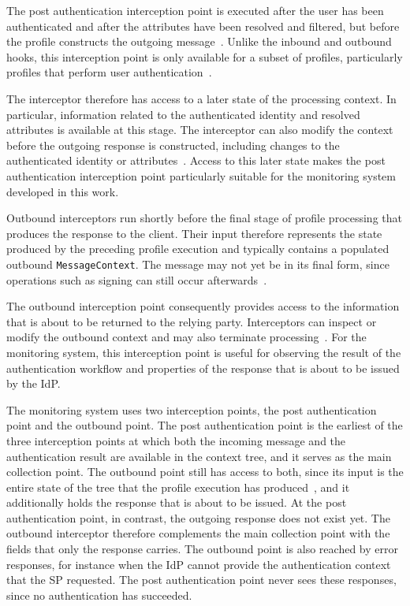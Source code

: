 \documentclass[../main.tex]{subfiles}
\begin{document}
The post authentication interception point is executed after the user has been authenticated and 
after the attributes have been resolved and filtered, but before the profile constructs the 
outgoing message~\cite{ProfileInterceptConfiguration}. 
Unlike the inbound and outbound hooks, this interception point is only available for a subset of 
profiles, particularly profiles that perform user authentication~\cite{ProfileHandling}.

The interceptor therefore has access to a later state of the processing context. 
In particular, information related to the authenticated identity and resolved attributes is available 
at this stage. 
The interceptor can also modify the context before the outgoing response is constructed, including 
changes to the authenticated identity or attributes~\cite{ProfileHandling}. 
Access to this later state makes the post authentication interception point particularly suitable 
for the monitoring system developed in this work. 

Outbound interceptors run shortly before the final stage of profile processing that produces the 
response to the client. 
Their input therefore represents the state produced by the preceding profile execution and typically 
contains a populated outbound \texttt{Message\allowbreak{}Context}. 
The message may not yet be in its final form, since operations such as signing can still occur 
afterwards~\cite{ProfileHandling}.

The outbound interception point consequently provides access to the information that is about to 
be returned to the relying party. 
Interceptors can inspect or modify the outbound context and may also terminate processing~\cite{ProfileHandling}.
For the monitoring system, this interception point is useful for observing the result of the 
authentication workflow and properties of the response that is about to be issued by the IdP.

The monitoring system uses two interception points, the post authentication point and the 
outbound point. 
The post authentication point is the earliest of the three interception points at which both the 
incoming message and the authentication result are available in the context tree, and it serves as 
the main collection point.
The outbound point still has access to both, since its input is the entire state of the tree that 
the profile execution has produced~\cite{ProfileHandling}, and it additionally holds the response 
that is about to be issued. 
At the post authentication point, in contrast, the outgoing response does not exist yet. 
The outbound interceptor therefore complements the main collection point with the fields that only 
the response carries. 
The outbound point is also reached by error responses, for instance when the IdP cannot provide 
the authentication context that the SP requested. 
The post authentication point never sees these responses, since no authentication has succeeded.
\end{document}
